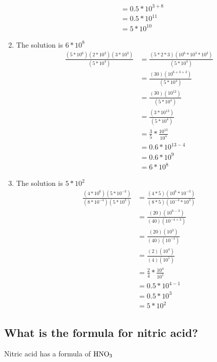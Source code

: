\documentclass[11pt]{article}
\begin{document}
\begin{enumerate}
\begin{align*}
&=0.5*10^{3+8}\\
&=0.5*10^11\\
&=5*10^{10}
\end{align*}
\item The solution is \(6*10^8\)
\begin{align*}
\frac{(5*10^6)(2*10^3)(3*10^3)}{(5*10^4)}&=\frac{(5*2*3)(10^6*10^3*10^3)}{(5*10^4)}\\
&=\frac{(30)(10^{6+3+3})}{(5*10^4)}\\
&=\frac{(30)(10^{12})}{(5*10^4)}\\
&=\frac{(3*10^{13})}{(5*10^4)}\\
&=\frac{3}{5}*\frac{10^{13}}{10^4}\\
&=0.6*10^{13-4}\\
&=0.6*10^9\\
&=6*10^8
\end{align*}
\item The solution is \(5*10^2^{}\)
\begin{align*}
\frac{(4*10^6)(5*10^{-3})}{(8*10^{-4})(5*10^3)}&=\frac{(4*5)(10^6*10^{-3})}{(8*5)(10^{-4}*10^3)}\\
&=\frac{(20)(10^{6-3}^{})}{(40)(10^{-4+3})}\\
&=\frac{(20)(10^3)}{(40)(10^{-1})}^{}\\
&=\frac{(2)(10^4)}{(4)(10^1)}^{}\\
&=\frac{2}{4}*\frac{10^4}{10^1}\\
&=0.5*10^{4-1}\\
&=0.5*10^3\\
&=5*10^2
\end{align*}
\end{enumerate}

\subsection{What is the formula for nitric acid?}
\label{sec:org113b52b}
Nitric acid has a formula of \(\ce{HNO3}\)
\end{document}
